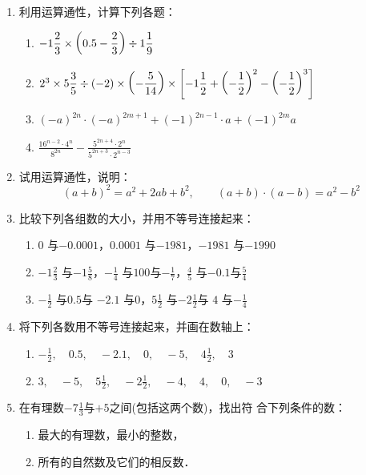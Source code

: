 \begin{enumerate}
	\item 利用运算通性，计算下列各题：
	\begin{enumerate}
		\item $-1\dfrac{2}{3}\times \left(0.5-\dfrac{2}{3}\right)\div 1\dfrac{1}{9}$
		\item $2^3\times 5\dfrac{3}{5}\div (-2)\times\left(-\dfrac{5}{14}\right)\times \left[-1\dfrac{1}{2}+\left(-\dfrac{1}{2}\right)^2-\left(-\dfrac{1}{2}\right)^3\right]$
		\item $(-a)^{2n}\cdot (-a)^{2m+1}+(-1)^{2n-1}\cdot a+(-1)^{2m}a$
		\item $\frac{16^{n-2}\cdot 4^n}{8^{2n}}-\frac{5^{2n+4}\cdot 2^n}{5^{2n+3}\cdot 2^{n-3}}$
	\end{enumerate}
	
	\item 试用运算通性，说明：
	\[(a+b)^2=a^2+2ab+b^2,\qquad (a+b)\cdot (a-b)=a^2-b^2 \]
	\item 比较下列各组数的大小，并用不等号连接起来：
	\begin{enumerate}
		\item $0$ 与$-0.0001$，\quad $0.0001$ 与$-1981$，\quad $-1981$ 与$-1990$ 
		\item $-1\frac{2}{3}$ 与$-1\frac{5}{8}$，\quad $-\frac{1}{4}$ 与$100$与$-\frac{1}{7}$，\quad $\frac{4}{5}$ 与$-0.1$与$\frac{5}{4}$
		\item  $-\frac{1}{2}$ 与$0.5$与 $-2.1$ 与$0$，\quad $5\frac{1}{2}$ 与$-2\frac{1}{2}$与 $4$ 与$-\frac{1}{4}$ 
	\end{enumerate}
	
	\item 将下列各数用不等号连接起来，并画在数轴上：
	\begin{enumerate}
		\item $-\frac{1}{2},\quad  0.5 ,\quad -2.1  ,\quad 0  ,\quad -5  ,\quad  4\frac{1}{2} ,\quad 3  $
		\item $3,\quad  -5 ,\quad 5\frac{1}{2}  ,\quad  -2\frac{1}{2} ,\quad  -4 ,\quad  4 ,\quad  0 ,\quad  -3 $
	\end{enumerate}
	
	\item  在有理数$-7\frac{1}{3}$与$+5$之间(包括这两个数)，找出符
	合下列条件的数：
	\begin{enumerate}
		\item 最大的有理数，最小的整数，
		\item 所有的自然数及它们的相反数．
	\end{enumerate}
	

\end{enumerate}
